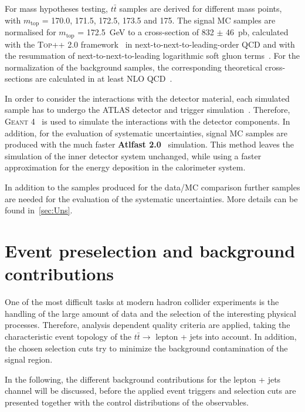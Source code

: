  For mass hypotheses testing, $t\bar{t}$ samples are derived for different mass points, with $m_{\text{top}}$ = 170.0, 171.5, 172.5, 173.5 and 175. The signal MC samples are normalised for $m_{\text{top}}$ = 172.5~GeV to a cross-section of 832 $\pm$ 46~pb, calculated with the \textsc{Top++ 2.0} framework~\cite{Czakon:2011xx} in next-to-next-to-leading-order QCD and with 
the resummation of next-to-next-to-leading logarithmic soft gluon terms~\cite{Cacciari:2011hy,Beneke:2011mq,Baernreuther:2012ws,Czakon:2012zr,Czakon:2013goa}.  For the normalization of the background samples, the corresponding  theoretical cross-sections are calculated in at least NLO  QCD~\cite{Catani:2009sm,Kidonakis:2010tc,Kidonakis:2010ux,Kidonakis:2011wy,Campbell:1999ah,Campbell:2011bn,Alwall:2014hca,deFlorian:2016spz,ATL-PHYS-PUB-2016-003}. 
 



 In order to consider the  interactions with the detector material, each simulated sample has to undergo the ATLAS detector and trigger simulation~\cite{Aad:2010ah}. Therefore, \textsc{Geant 4}~\cite{Agostinelli:2002hh}  is used to simulate the interactions with the detector components.  In addition, for the evaluation of systematic uncertainties, signal MC samples are produced with the much faster \textbf{Atlfast 2.0}~\cite{Richter-Was:683751} simulation. This method leaves the simulation of the inner detector system unchanged, while using a faster approximation for the energy deposition in the calorimeter system.

 In addition to the samples produced for the data/MC comparison further samples are needed for the evaluation of the systematic uncertainties. More details can be found in~\cref{sec:Uns}. 



\section{Event preselection and background contributions}\label{selection}
 One of the most difficult tasks at modern hadron collider experiments is the handling of the large amount of data and the selection of the interesting physical processes. Therefore, analysis dependent quality criteria are applied, taking the characteristic event topology of the  $t\bar{t}\rightarrow$ lepton + jets into account. In addition, the chosen selection cuts try to minimize the background contamination of the signal region. 
 
 In the following, the different background contributions for the lepton + jets channel will be discussed, before the applied event triggers and selection cuts are presented together with the control distributions of the observables.
 
